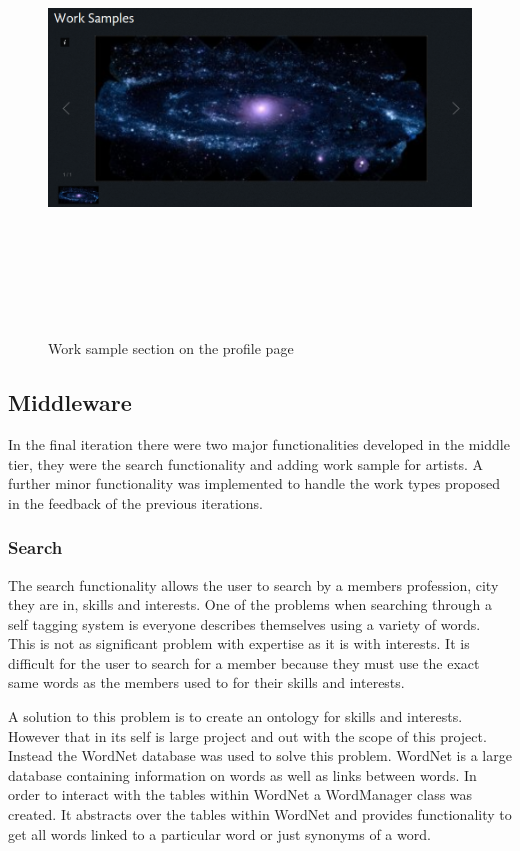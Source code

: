 \documentclass[a4paper,oneside,11pt]{report}
\begin{document}
\begin{figure}[!ht]
\centering
\includegraphics[width=\textwidth,height=12cm,keepaspectratio]{third-iteration-profile-worksample.png}
\caption{Work sample section on the profile page}
\end{figure}
\pagebreak
\subsection{Middleware}
In the final iteration there were two major functionalities developed in the middle tier, they were the search functionality and adding work sample for artists. A further minor functionality was implemented to handle the work types proposed in the feedback of the previous iterations.

\subsubsection{Search}
The search functionality allows the user to search by a members profession, city they are in, skills and interests. One of the problems when searching through a self tagging system is everyone describes themselves using a variety of words. This is not as significant problem with expertise as it is with interests. It is difficult for the user to search for a member because they must use the exact same words as the members used to for their skills and interests. 

A solution to this problem is to create an ontology for skills and interests. However that in its self is large project and out with the scope of this project. Instead the WordNet database was used to solve this problem. WordNet is a large database containing information on words as well as links between words. In order to interact with the tables within WordNet a WordManager class was created. It abstracts over the tables within WordNet and provides functionality to get all words linked to a particular word or just synonyms of a word.
\end{document}

